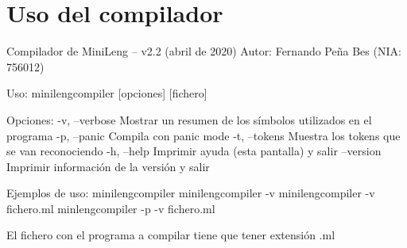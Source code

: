 \documentclass[../main.tex]{subfiles}
\begin{document}
\section{Uso del compilador}
Compilador de MiniLeng -- v2.2 (abril de 2020)
Autor: Fernando Peña Bes (NIA: 756012)

Uso: minilengcompiler [opciones] [fichero]

Opciones:
  -v, --verbose  Mostrar un resumen de los símbolos utilizados en el programa
  -p, --panic	 Compila con panic mode
  -t, --tokens   Muestra los tokens que se van reconociendo
  -h, --help	 Imprimir ayuda (esta pantalla) y salir
  --version      Imprimir información de la versión y salir


Ejemplos de uso:
    minilengcompiler
    minilengcompiler -v
    minilengcompiler -v fichero.ml
    minlengcompiler -p -v fichero.ml

El fichero con el programa a compilar tiene que tener extensión .ml
\end{document}
